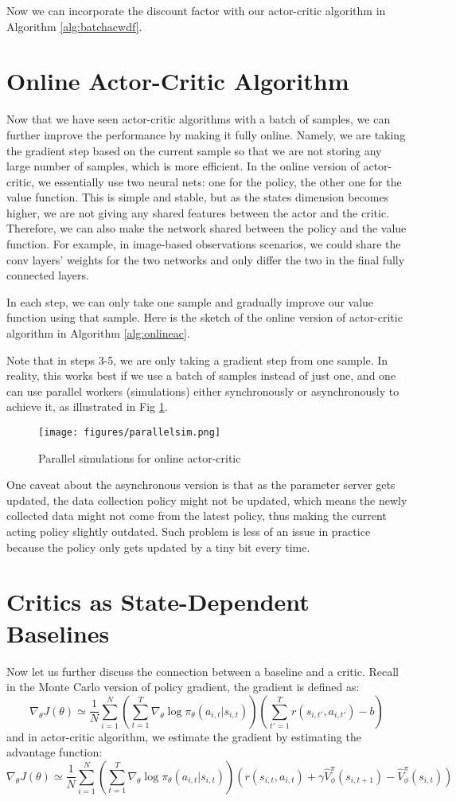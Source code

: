 Now we can incorporate the discount factor with our actor-critic algorithm in Algorithm \ref{alg:batchacwdf}.


\section{Online Actor-Critic Algorithm}
Now that we have seen actor-critic algorithms with a batch of samples, we can further improve the performance by making it fully online. Namely, we are taking the gradient step based on the current sample so that we are not storing any large number of samples, which is more efficient. In the online version of actor-critic, we essentially use two neural nets: one for the policy, the other one for the value function. This is simple and stable, but as the states dimension becomes higher, we are not giving any shared features between the actor and the critic. Therefore, we can also make the network shared between the policy and the value function. For example, in image-based observations scenarios, we could share the conv layers' weights for the two networks and only differ the two in the final fully connected layers.

In each step, we can only take one sample and gradually improve our value function using that sample. Here is the sketch of the online version of actor-critic algorithm in Algorithm \ref{alg:onlineac}. 

Note that in steps 3-5, we are only taking a gradient step from one sample. In reality, this works best if we use a batch of samples instead of just one, and one can use parallel workers (simulations) either synchronously or asynchronously to achieve it, as illustrated in Fig \ref{fig:parallelsim}. 
\begin{figure}
    \centering
    \texttt{[image: figures/parallelsim.png]}
    \caption{Parallel simulations for online actor-critic}
    \label{fig:parallelsim}
\end{figure}

One caveat about the asynchronous version is that as the parameter server gets updated, the data collection policy might not be updated, which means the newly collected data might not come from the latest policy, thus making the current acting policy slightly outdated. Such problem is less of an issue in practice because the policy only gets updated by a tiny bit every time.

\section{Critics as State-Dependent Baselines}
Now let us further discuss the connection between a baseline and a critic. Recall in the Monte Carlo version of policy gradient, the gradient is defined as:
$$\nabla_\theta J(\theta) \simeq \frac{1}{N}\sum_{i=1}^N\left(\sum_{t=1}^T\nabla_\theta \log\pi_\theta(a_{i,t}|s_{i,t})\right)\left(\sum_{t'=1}^T r(s_{i,t'},a_{i,t'}) - b\right)$$
and in actor-critic algorithm, we estimate the gradient by estimating the advantage function:
$$\nabla_\theta J(\theta) \simeq \frac{1}{N}\sum_{i=1}^N\left(\sum_{t=1}^T\nabla_\theta \log\pi_\theta(a_{i,t}|s_{i,t})\right)\left(r(s_{i,t},a_{i,t}) + \gamma\hat{V}_\phi^\pi(s_{i,t+1})-\hat{V}_\phi^\pi(s_{i,t})\right)$$

